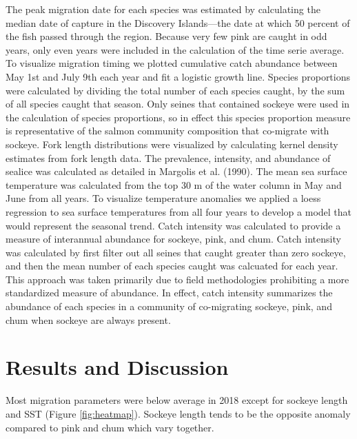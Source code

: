 \documentclass[fleqn,10pt]{wlpeerj} %
\begin{document}
The peak migration date for each species was estimated by calculating
the median date of capture in the Discovery Islands---the date at which
50 percent of the fish passed through the region. Because very few pink
are caught in odd years, only even years were included in the
calculation of the time serie average. To visualize migration timing we
plotted cumulative catch abundance between May 1st and July 9th each
year and fit a logistic growth line. Species proportions were calculated
by dividing the total number of each species caught, by the sum of all
species caught that season. Only seines that contained sockeye were used
in the calculation of species proportions, so in effect this species
proportion measure is representative of the salmon community composition
that co-migrate with sockeye. Fork length distributions were visualized
by calculating kernel density estimates from fork length data. The
prevalence, intensity, and abundance of sealice was calculated as
detailed in Margolis et al. (1990). The mean sea surface temperature was
calculated from the top 30 m of the water column in May and June from
all years. To visualize temperature anomalies we applied a loess
regression to sea surface temperatures from all four years to develop a
model that would represent the seasonal trend. Catch intensity was
calculated to provide a measure of interannual abundance for sockeye,
pink, and chum. Catch intensity was calculated by first filter out all
seines that caught greater than zero sockeye, and then the mean number
of each species caught was calcuated for each year. This approach was
taken primarily due to field methodologies prohibiting a more
standardized measure of abundance. In effect, catch intensity summarizes
the abundance of each species in a community of co-migrating sockeye,
pink, and chum when sockeye are always present.

\section*{Results and Discussion}\label{results-and-discussion}

Most migration parameters were below average in 2018 except for sockeye
length and SST (Figure \ref{fig:heatmap}). Sockeye length tends to be
the opposite anomaly compared to pink and chum which vary together.
\end{document}

